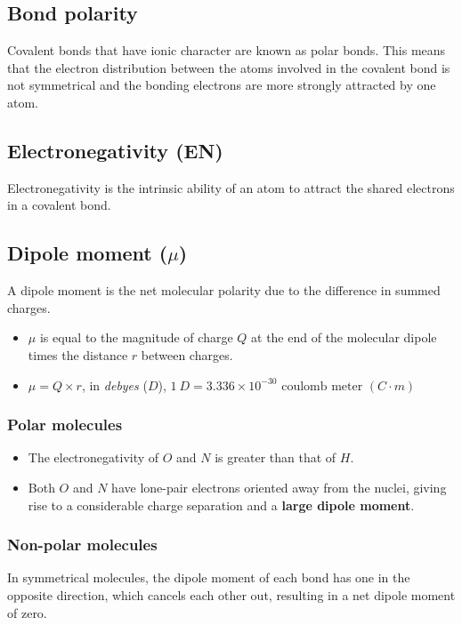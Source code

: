 \documentclass[11pt]{article}
\begin{document}
\subsection{Bond polarity}
\label{sec:org4a28c68}
Covalent bonds that have ionic character are known as polar bonds. This means that the electron distribution between the atoms involved in the covalent bond is not symmetrical and the bonding electrons are more strongly attracted by one atom.

\subsection{Electronegativity (EN)}
\label{sec:org12bc14b}
Electronegativity is the intrinsic ability of an atom to attract the shared electrons in a covalent bond.

\subsection{Dipole moment (\(\mu\))}
\label{sec:orgd9a2d38}
A dipole moment is the net molecular polarity due to the difference in summed charges.

\begin{itemize}
\item \(\mu\) is equal to the magnitude of charge \(Q\) at the end of the molecular dipole times the distance \(r\) between charges.
\item \(\mu = Q \times r\), in \emph{debyes} (\(D\)), \(\qty{1}{\unit{D}} = 3.336 \times 10^{-30} \text{ coulomb meter } (C \cdot m)\)
\end{itemize}

\subsubsection{Polar molecules}
\label{sec:org1e24321}
\begin{itemize}
\item The electronegativity of \(O\) and \(N\) is greater than that of \(H\).
\item Both \(O\) and \(N\) have lone-pair electrons oriented away from the nuclei, giving rise to a considerable charge separation and a \textbf{large dipole moment}.
\end{itemize}

\subsubsection{Non-polar molecules}
\label{sec:orgbca7f16}
In symmetrical molecules, the dipole moment of each bond has one in the opposite direction, which cancels each other out, resulting in a net dipole moment of zero.
\end{document}
